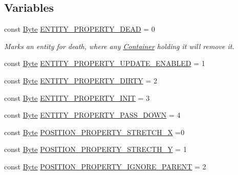 \subsection*{Variables}
\begin{DoxyCompactItemize}
\item 
const \hyperlink{namespacemc_a64bc4fa1f43bc4da5c7ac98c04c863e8}{Byte} \hyperlink{namespacemc_a6a2ed19ea381451dcc4d8229a0ce3a79}{E\+N\+T\+I\+T\+Y\+\_\+\+P\+R\+O\+P\+E\+R\+T\+Y\+\_\+\+D\+E\+AD} = 0
\begin{DoxyCompactList}\small\item\em Marks an entity for death, where any \hyperlink{classmc_1_1_container}{Container} holding it will remove it. \end{DoxyCompactList}\item 
const \hyperlink{namespacemc_a64bc4fa1f43bc4da5c7ac98c04c863e8}{Byte} \hyperlink{namespacemc_afcf43f98aa3733418994e9e1cadd7ce7}{E\+N\+T\+I\+T\+Y\+\_\+\+P\+R\+O\+P\+E\+R\+T\+Y\+\_\+\+U\+P\+D\+A\+T\+E\+\_\+\+E\+N\+A\+B\+L\+ED} = 1
\item 
const \hyperlink{namespacemc_a64bc4fa1f43bc4da5c7ac98c04c863e8}{Byte} \hyperlink{namespacemc_a68ae3eb7148606fe27d62d968b47294b}{E\+N\+T\+I\+T\+Y\+\_\+\+P\+R\+O\+P\+E\+R\+T\+Y\+\_\+\+D\+I\+R\+TY} = 2
\item 
const \hyperlink{namespacemc_a64bc4fa1f43bc4da5c7ac98c04c863e8}{Byte} \hyperlink{namespacemc_a0702c8f305365db8ecb2b5c4631e6fdc}{E\+N\+T\+I\+T\+Y\+\_\+\+P\+R\+O\+P\+E\+R\+T\+Y\+\_\+\+I\+N\+IT} = 3
\item 
const \hyperlink{namespacemc_a64bc4fa1f43bc4da5c7ac98c04c863e8}{Byte} \hyperlink{namespacemc_a4464618e931e7662c7042c3e6ef03f63}{E\+N\+T\+I\+T\+Y\+\_\+\+P\+R\+O\+P\+E\+R\+T\+Y\+\_\+\+P\+A\+S\+S\+\_\+\+D\+O\+WN} = 4
\item 
const \hyperlink{namespacemc_a64bc4fa1f43bc4da5c7ac98c04c863e8}{Byte} \hyperlink{namespacemc_a3f402a582017395627a94f19c99ae875}{P\+O\+S\+I\+T\+I\+O\+N\+\_\+\+P\+R\+O\+P\+E\+R\+T\+Y\+\_\+\+S\+T\+R\+E\+T\+C\+H\+\_\+X} =0
\item 
const \hyperlink{namespacemc_a64bc4fa1f43bc4da5c7ac98c04c863e8}{Byte} \hyperlink{namespacemc_a93b89015c5feaff1a86607a1bbe5b7b6}{P\+O\+S\+I\+T\+I\+O\+N\+\_\+\+P\+R\+O\+P\+E\+R\+T\+Y\+\_\+\+S\+T\+R\+E\+C\+T\+H\+\_\+Y} = 1
\item 
const \hyperlink{namespacemc_a64bc4fa1f43bc4da5c7ac98c04c863e8}{Byte} \hyperlink{namespacemc_a9085688ce1dec515cd75c6fef11a1ec5}{P\+O\+S\+I\+T\+I\+O\+N\+\_\+\+P\+R\+O\+P\+E\+R\+T\+Y\+\_\+\+I\+G\+N\+O\+R\+E\+\_\+\+P\+A\+R\+E\+NT} = 2

\end{DoxyCompactItemize}
